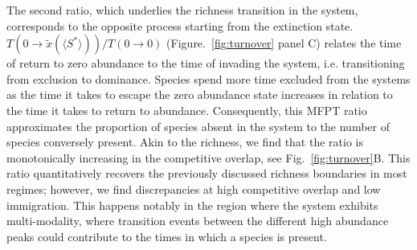 \documentclass[9pt,twocolumn,twoside,lineno]{pnas-new}
\begin{document}
The second ratio, which underlies the richness transition in the system, corresponds to the opposite process starting from the extinction state.
$T(0\rightarrow \tilde{x}(\langle S^* \rangle ))/T(0\rightarrow0)$ (Figure.~\ref{fig:turnover} panel C) relates the time of return to zero abundance to the time of invading the system, i.e. transitioning from exclusion to dominance. 
Species spend more time excluded from the systems as the time it takes to escape the zero abundance state increases in relation to the time it takes to return to abundance.
Consequently, this MFPT ratio approximates the proportion of species absent in the system to the number of species conversely present.
Akin to the richness, we find that the ratio is monotonically increasing in the competitive overlap, see Fig.~\ref{fig:turnover}B.
This ratio quantitatively recovers the previously discussed richness boundaries in most regimes; however, we find discrepancies at high competitive overlap and low immigration.
This happens notably in the region where the system exhibits multi-modality, where transition events between the different high abundance peaks could contribute to the times in which a species is present.
\end{document}
